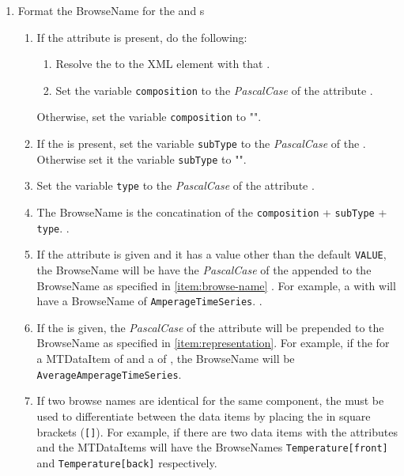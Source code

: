 \begin{enumerate}
  \item Format the \gls{BrowseName} for the  and  s
  \begin{enumerate}[after=\vspace{\baselineskip}]
    \setlength\itemsep{1em}
    \item If the  attribute  is present, do the following:
    \begin{enumerate}
      \item Resolve the  to the  XML element with that .
      \item Set the variable \texttt{composition} to the \textit{PascalCase} of the  attribute .
    \end{enumerate}
    Otherwise, set the variable \texttt{composition} to "".
    \item If the  is present, set the variable \texttt{subType} to the \textit{PascalCase} of the . Otherwise set it the variable \texttt{subType} to "".
    \item Set the variable \texttt{type} to the \textit{PascalCase} of the  attribute .
    \item The \gls{BrowseName} is the concatination of the \texttt{composition} + \texttt{subType} + \texttt{type}. \label{item:browse-name}.
    \item If the  attribute is given and it has a value other than the default \texttt{VALUE}, the \gls{BrowseName} will be have the \textit{PascalCase} of the  appended to the \gls{BrowseName}  as specified in \ref{item:browse-name} . For example, a  with  will have a \gls{BrowseName} of \texttt{AmperageTimeSeries}. \label{item:representation}.
    \item If the  is given, the \textit{PascalCase} of the  attribute will be prepended to the \gls{BrowseName}  as specified in \ref{item:representation}. For example, if the  for a \gls{MTDataItem} of  and a  of , the \gls{BrowseName} will be  \texttt{AverageAmperageTimeSeries}. \label{item:statistic}
    \item If two browse names are identical for the same component, the  must be used to differentiate between the data items by placing the  in square brackets (\texttt{[]}). For example, if there are two  data items with the attributes  and  the \glspl{MTDataItem} will have the \glspl{BrowseName} \texttt{Temperature[front]} and \texttt{Temperature[back]} respectively. \label{item:data-item-name}
  \end{enumerate} 


\end{enumerate}
